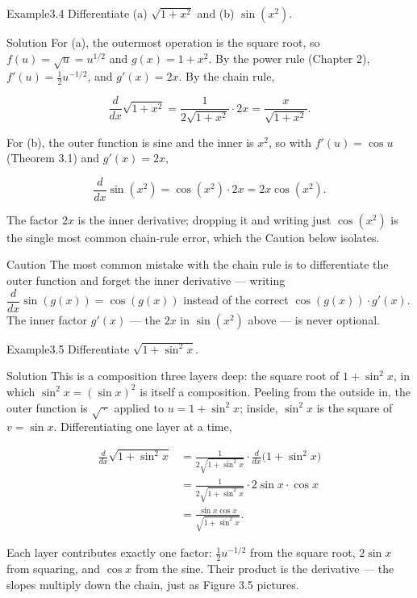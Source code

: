 \begin{hkworkedexample}
\begin{hkexample}{Example}{3.4}{}
Differentiate (a) \(\sqrt{1 + x^{2}}\) and (b) \(\sin(x^{2})\).
\end{hkexample}
\begin{hksolution}{Solution}{}{}
For (a), the outermost operation is the square root, so \(f(u) = \sqrt{u} = u^{1/2}\) and \(g(x) = 1 + x^{2}\). By the power rule (Chapter 2), \(f'(u) = \tfrac12 u^{-1/2}\), and \(g'(x) = 2x\). By the chain rule,

\[ \frac{d}{dx}\sqrt{1 + x^{2}} = \frac{1}{2\sqrt{1 + x^{2}}}\cdot 2x = \frac{x}{\sqrt{1 + x^{2}}}. \]

For (b), the outer function is sine and the inner is \(x^{2}\), so with \(f'(u) = \cos u\) (Theorem 3.1) and \(g'(x) = 2x\),

\[ \frac{d}{dx}\sin(x^{2}) = \cos(x^{2})\cdot 2x = 2x\cos(x^{2}). \]

The factor \(2x\) is the inner derivative; dropping it and writing just \(\cos(x^{2})\) is the single most common chain-rule error, which the Caution below isolates.
\end{hksolution}
\end{hkworkedexample}
\begin{hkcaution}{Caution}{}{}
The most common mistake with the chain rule is to differentiate the outer function and forget the inner derivative — writing \(\dfrac{d}{dx}\sin(g(x)) = \cos(g(x))\) instead of the correct \(\cos(g(x))\cdot g'(x)\). The inner factor \(g'(x)\) — the \(2x\) in \(\sin(x^{2})\) above — is never optional.
\end{hkcaution}
\begin{hkworkedexample}
\begin{hkexample}{Example}{3.5}{}
Differentiate \(\sqrt{1 + \sin^{2} x}\).
\end{hkexample}
\begin{hksolution}{Solution}{}{}
This is a composition three layers deep: the square root of \(1 + \sin^{2} x\), in which \(\sin^{2} x = (\sin x)^{2}\) is itself a composition. Peeling from the outside in, the outer function is \(\sqrt{\,\cdot\,}\) applied to \(u = 1 + \sin^{2} x\); inside, \(\sin^{2} x\) is the square of \(v = \sin x\). Differentiating one layer at a time,

\[ \begin{aligned}
          \frac{d}{dx}\sqrt{1 + \sin^{2} x}
            &= \frac{1}{2\sqrt{1 + \sin^{2} x}}\cdot \frac{d}{dx}\bigl(1 + \sin^{2} x\bigr) \\[2pt]
            &= \frac{1}{2\sqrt{1 + \sin^{2} x}}\cdot 2\sin x\cdot \cos x \\[2pt]
            &= \frac{\sin x \cos x}{\sqrt{1 + \sin^{2} x}}.
        \end{aligned} \]

Each layer contributes exactly one factor: \(\tfrac12 u^{-1/2}\) from the square root, \(2\sin x\) from squaring, and \(\cos x\) from the sine. Their product is the derivative — the slopes multiply down the chain, just as Figure 3.5 pictures.
\end{hksolution}
\end{hkworkedexample}
